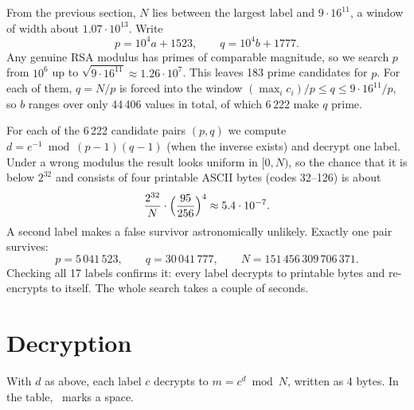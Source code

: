 \documentclass[11pt,a4paper]{article}
\newcommand{\tx}[1]{\texttt{#1}}
\newcommand{\vs}{\textvisiblespace}
\newcommand{\comment}[1]{}
\begin{document}
From the previous section, $N$ lies between the largest label and
$9\cdot 16^{11}$, a window of width about $1.07\cdot 10^{13}$. Write
\[
p = 10^4 a + 1523, \qquad q = 10^4 b + 1777.
\]
Any genuine RSA modulus has primes of comparable magnitude, so we search
$p$ from $10^6$ up to $\sqrt{9\cdot 16^{11}} \approx 1.26\cdot 10^7$. This
leaves 183 prime candidates for $p$. For each of them, $q = N/p$ is forced
into the window $(\max_i c_i)/p \le q \le 9\cdot 16^{11}/p$, so $b$ ranges
over only 44\,406 values in total, of which 6\,222 make $q$ prime.

For each of the 6\,222 candidate pairs $(p,q)$ we compute
$d = e^{-1} \bmod (p-1)(q-1)$ (when the inverse exists) and decrypt one
label. Under a wrong modulus the result looks uniform in $[0,N)$, so the
chance that it is below $2^{32}$ and consists of four printable ASCII bytes
(codes 32--126) is about
\[
\frac{2^{32}}{N}\cdot\Bigl(\frac{95}{256}\Bigr)^4 \approx 5.4\cdot 10^{-7}.
\]
A second label makes a false survivor astronomically unlikely. Exactly one
pair survives:
\[
p = 5\,041\,523, \qquad q = 30\,041\,777, \qquad
N = 151\,456\,309\,706\,371.
\]
Checking all 17 labels confirms it: every label decrypts to printable bytes
and re-encrypts to itself. The whole search takes a couple of seconds.

\comment{
\paragraph*{Remark (alternative: known-plaintext recovery).}
The modulus can also be recovered without the years, at the price of
guessing a fragment of the plaintext. If $c = m^e \bmod N$, then $N$ divides
the integer $m^e - c$, so two correctly guessed plaintext--ciphertext pairs
give
\[
N \;\Big|\; \gcd\!\left(m_1^{\,e} - c_1,\; m_2^{\,e} - c_2\right),
\]
and in practice this gcd equals $N$ or a small multiple of it. Guessing that
the hidden text contains Shamir's best-known line, and trying block sizes of
3 to 6 bytes, every alignment, and all ordered pairs of labels, the pair
\[
m_1 = \tx{"ptog"},\ c_1 = \tx{0037e3e277d0}, \qquad
m_2 = \tx{"raph"},\ c_2 = \tx{5bf4286560fd}
\]
(4-byte blocks, starting 3 characters into ``Cryptography'') gives the same
$N = 151\,456\,309\,706\,371$ directly.
}
\section{Decryption}

With $d$ as above, each label $c$ decrypts to $m = c^d \bmod N$, written as
4 bytes. In the table, \vs\ marks a space.
\end{document}
